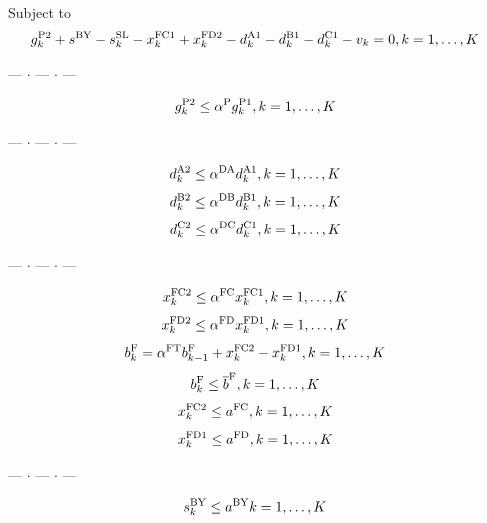\documentclass{jarticle}
\begin{document}
\noindent
{\rm Subject to}
%
\begin{equation}
 g^{\rm P2}_{k} + s^{\rm BY} - s^{\rm SL}_{k}
 - x^{\rm FC1}_{k} + x^{\rm FD2}_{k} 
 - d^{\rm A1}_{k} - d^{\rm B1}_{k} - d^{\rm C1}_{k} - v_k = 0,
 \hfill
 k=1,\ldots,K
~~
\end{equation}
%
\begin{center} --- $ \cdot $ --- $ \cdot $ --- \end{center}
%
\begin{equation}
 g^{\rm P2}_{k} \le \alpha^{\rm P} g^{\rm P1}_{k} ,
 \hfill
 k=1,\ldots,K
 ~~
 \label{eq:gP1gP2}
\end{equation}
%
\begin{center} --- $ \cdot $ --- $ \cdot $ --- \end{center}
%
\begin{equation}
 d^{\rm A2}_{k} \le \alpha^{\rm DA} d^{\rm A1}_{k} ,
 \hfill
 k=1,\ldots,K
~~
 \label{eq:dA1A2}
\end{equation}
%
\begin{equation}
 d^{\rm B2}_{k} \le \alpha^{\rm DB} d^{\rm B1}_{k},
 \hfill
 k=1,\ldots,K
~~
 \label{eq:dB1B2}
\end{equation}
%
\begin{equation}
 d^{\rm C2}_{k} \le \alpha^{\rm DC} d^{\rm C1}_{k},
 \hfill
 k=1,\ldots,K
~~
 \label{eq:dC1C2}
\end{equation}
%
\begin{center} --- $ \cdot $ --- $ \cdot $ --- \end{center}
%
\begin{equation}
 x^{\rm FC2}_{k} \le \alpha^{\rm FC}x^{\rm FC1}_{k},
 \hfill
 k=1,\ldots,K
~~
 \label{eq:xFC1FC2}
\end{equation}
%
\begin{equation}
 x^{\rm FD2}_{k} \le \alpha^{\rm FD} x^{\rm FD1}_{k} ,
 \hfill
 k=1,\ldots,K
~~
 \label{eq:FD1FD2}
\end{equation}
%
\begin{equation}
 b^{\rm F}_{k} = \alpha^{\rm FT} b^{\rm F}_{k-1} + x^{\rm FC2}_{k} - x^{\rm FD1}_{k},
 \hfill
 k=1,\ldots,K
~~
\end{equation}
%
\begin{equation}
 b^{\rm F}_{k} \le \overline{b}^{\rm F},
 \hfill
 k=1,\ldots,K
~~
\end{equation}
%
\begin{equation}
 x^{\rm FC2}_{k} \le a^{\rm FC},
 \hfill
 k=1,\ldots,K
~~
\end{equation}
%
\begin{equation}
 x^{\rm FD1}_{k} \le a^{\rm FD},
 \hfill
 k=1,\ldots,K
~~
\end{equation}
%
\begin{center} --- $ \cdot $ --- $ \cdot $ --- \end{center}
%
\begin{equation}
 s^{\rm BY}_{k} \le  a^{\rm BY}
 \hfill
 k=1,\ldots,K
~~
 \label{eq:sMax}
\end{equation}
\end{document}
